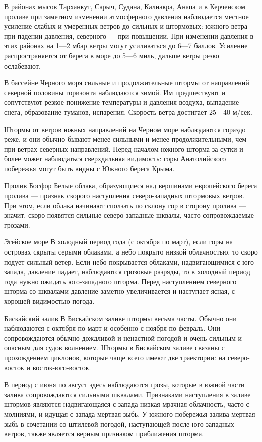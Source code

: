В районах мысов Тарханкут, Сарыч, Судана, Калиакра, Анапа и в Керченском проливе при заметном изменении атмосферного давления наблюдается местное усиление слабых и умеренных ветров до сильных и штормовых: южного ветра при падении давления, северного — при повышении. При изменении давления в этих районах на 1—2 мбар ветры могут усиливаться до 6—7 баллов. Усиление распространяется от берега в море до 5—6 миль, дальше ветры резко ослабевают.

В бассейне Черного моря сильные и продолжительные штормы от направлений северной половины горизонта наблюдаются зимой. Им предшествуют и сопутствуют резкое понижение температуры и давления воздуха, выпадение снега, образование туманов, испарения. Скорость ветра достигает 25—40 м/сек.

Штормы от ветров южных направлений на Черном море наблюдаются гораздо реже, и они обычно бывают менее сильными и менее продолжительными, чем при ветрах северных направлений. Перед началом южного шторма за сутки и более может наблюдаться сверхдальняя видимость: горы Анатолийского побережья могут быть видны с Южного берега Крыма.

Пролив Босфор
Белые облака, образующиеся над вершинами европейского берега пролива — признак скорого наступления северо-западных штормовых ветров. При этом, если облака начинают сползать по склону гор в сторону пролива — значит, скоро появятся сильные северо-западные шквалы, часто сопровождаемые грозами.

Эгейское море
В холодный период года (с октября по март), если горы на островах скрыты серыми облаками, а небо покрыто низкой облачностью, то скоро подует сильный ветер. Если небо покрывается облаками, надвигающимися с юго-запада, давление падает, наблюдаются грозовые разряды, то в холодный период года нужно ожидать юго-западного шторма. Перед наступлением северного шторма со шквалами давление заметно увеличивается и наступает ясная, с хорошей видимостью погода.

Бискайский залив
В Бискайском заливе штормы весьма часты. Обычно они наблюдаются с октября по март и особенно с ноября по февраль. Они сопровождаются обычно дождливой и ненастной погодой и очень сильным и опасным для судов волнением. Штормы в Бискайском заливе связаны с прохождением циклонов, которые чаще всего имеют две траектории: на северо-восток и восток-юго-восток.

В период с июня по август здесь наблюдаются грозы, которые в южной части залива сопровождаются сильными шквалами. Признаками наступления в заливе штормов являются надвигающаяся с запада низкая мрачная облачность, часто с молниями, и идущая с запада мертвая зыбь. У южного побережья залива мертвая зыбь в сочетании со штилевой погодой, наступающей после юго-западных ветров, также является верным признаком приближения шторма.

